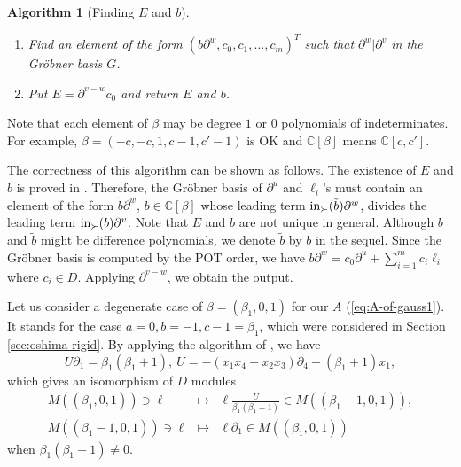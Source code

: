 \documentclass{article}
\def\CC{\mathbb{C}}
\def\pd#1{\partial_{#1}}
\newtheorem{algorithm}{Algorithm}
\begin{document}
\begin{algorithm}[Finding $E$ and $b$]
\begin{enumerate}
\begin{equation}
  \cdots,
 \left( \begin{array}{c}\ell_m\\ 0\\ 0\\ 0\\ \cdot\\ \cdot\\ \cdot\\ 1\end{array} \right)  \in D^{m+2}
\end{equation}  
The tie breaker $\prec$ of the POT order is
$\beta \prec (\mbox{$\pd{i}$'s in the support of $\pd{}^v$}) \prec 
(\mbox{other variables})$.
\item Find an element of the form
$(b \pd{}^w,c_0, c_1, \ldots,c_m)^T$ such that $\pd{}^w | \pd{}^v$ 
in the Gr\"obner basis $G$.
\item Put $E=\pd{}^{v-w} c_0$ and return $E$ and $b$.
\end{enumerate}
\end{algorithm}
Note that each element of $\beta$ may be degree $1$ or $0$ polynomials
of indeterminates.
For example, $\beta=(-c,-c,1,c-1,c'-1)$ is OK and
$\CC[\beta]$ means $\CC[c,c']$.

The correctness of this algorithm can be shown as follows.
The existence of $E$ and $b$ is proved in \cite{saito-isom}.
Therefore, the Gr\"obner basis of $\pd{}^u$ and $\ell_i$'s
must contain an element of the form $\tilde{b} \pd{}^w$, $\tilde{b} \in \CC[\beta]$ 
whose leading term ${\rm in}_\succ(\tilde{b}) \pd{}^w$,
divides the leading term ${\rm in}_\succ(b) \pd{}^v$.
Note that $E$ and $b$ are not unique in general. 
Although $b$ and $\tilde{b}$ might be difference polynomials,
we denote $\tilde{b}$ by $b$ in the sequel.
Since the Gr\"obner basis is computed by the POT order,
we have
$ b \pd{}^w = c_0 \pd{}^u + \sum_{i=1}^m c_i \ell_i$
where $c_i \in D$.
Applying $\pd{}^{v-w}$, we obtain the output.


Let us consider a degenerate case of
$\beta=(\beta_1,0,1)$
for our $A$ (\ref{eq:A-of-gauss1}). 
It stands for the case $a=0, b=-1, c-1=\beta_1$,
which were considered in Section \ref{sec:oshima-rigid}.
By applying the algorithm of \cite{saito-isom}, we have
\begin{equation}
 U \pd{1} = \beta_1(\beta_1+1), \ 
 U= -(x_1 x_4-x_2x_3)\pd{4}+(\beta_1+1)x_1,
\end{equation}
which gives an isomorphism of $D$ modules 
\begin{eqnarray} \label{eq:A-case-a0-bm1}
M((\beta_1,0,1)) \ni \ell &\longmapsto& \ell \frac{U}{\beta_1(\beta_1+1)} \in  M((\beta_1-1,0,1)), \\ 
M((\beta_1-1,0,1)) \ni \ell &\longmapsto& \ell\pd{1} \in  M((\beta_1,0,1)) \nonumber
\end{eqnarray}
when $\beta_1(\beta_1+1) \not= 0$.
\end{document}
